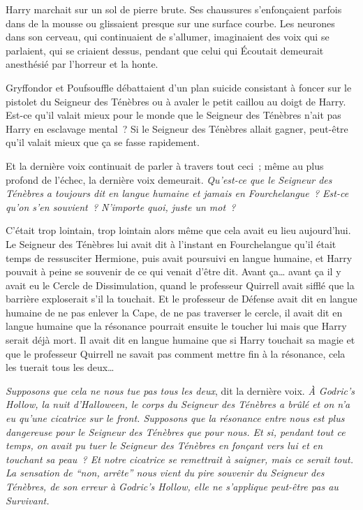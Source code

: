 Harry marchait sur un sol de pierre brute.
Ses chaussures s'enfonçaient parfois dans de la mousse ou glissaient presque sur une surface courbe.
Les neurones dans son cerveau, qui continuaient de s'allumer, imaginaient des voix qui se parlaient, qui se criaient dessus, pendant que celui qui Écoutait demeurait anesthésié par l'horreur et la honte.

Gryffondor et Poufsouffle débattaient d'un plan suicide consistant à foncer sur le pistolet du Seigneur des Ténèbres ou à avaler le petit caillou au doigt de Harry.
Est-ce qu'il valait mieux pour le monde que le Seigneur des Ténèbres n'ait pas Harry en esclavage mental~?
Si le Seigneur des Ténèbres allait gagner, peut-être qu'il valait mieux que ça se fasse rapidement.

Et la dernière voix continuait de parler à travers tout ceci~; même au plus profond de l'échec, la dernière voix demeurait.
\emph{Qu'est-ce que le Seigneur des Ténèbres a toujours dit en langue humaine et jamais en Fourchelangue~?
Est-ce qu'on s'en souvient~?
N'importe quoi, juste un mot~?}

C'était trop lointain, trop lointain alors même que cela avait eu lieu aujourd'hui.
Le Seigneur des Ténèbres lui avait dit à l'instant en Fourchelangue qu'il était temps de ressusciter Hermione, puis avait poursuivi en langue humaine, et Harry pouvait à peine se souvenir de ce qui venait d'être dit.
Avant ça… avant ça il y avait eu le Cercle de Dissimulation, quand le professeur Quirrell avait sifflé que la barrière exploserait s'il la touchait.
Et le professeur de Défense avait dit en langue humaine de ne pas enlever la Cape, de ne pas traverser le cercle, il avait dit en langue humaine que la résonance pourrait ensuite le toucher lui mais que Harry serait déjà mort.
Il avait dit en langue humaine que si Harry touchait sa magie et que le professeur Quirrell ne savait pas comment mettre fin à la résonance, cela les tuerait tous les deux…

\emph{Supposons que cela ne nous tue pas tous les deux}, dit la dernière voix.
\emph{À Godric's Hollow, la nuit d'Halloween, le corps du Seigneur des Ténèbres a brûlé et on n'a eu qu'une cicatrice sur le front.
Supposons que la résonance entre nous est plus dangereuse pour le Seigneur des Ténèbres que pour nous.
Et si, pendant tout ce temps, on avait pu tuer le Seigneur des Ténèbres en fonçant vers lui et en touchant sa peau~?
Et notre cicatrice se remettrait à saigner, mais ce serait tout.
La sensation de “non, arrête” nous vient du pire souvenir du Seigneur des Ténèbres, de son erreur à Godric's Hollow, elle ne s'applique peut-être pas au Survivant.}

